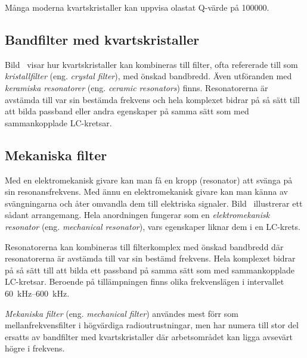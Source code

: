 Många moderna kvartskristaller kan uppvisa olastat Q-värde på 100000.

\vspace{12pt} %

\subsection{Bandfilter med kvartskristaller}
\label{bandfilter_kristall}


Bild~ visar hur kvartskristaller kan kombineras till
filter, ofta refererade till som \emph{kristallfilter} (eng.
\emph{crystal filter}), med önskad bandbredd.
Även utföranden med \emph{keramiska resonatorer} (eng.
\emph{ceramic resonators}) finns.
Resonatorerna är avstämda till var sin bestämda frekvens och hela komplexet
bidrar på så sätt till att bilda passband eller andra egenskaper på samma sätt
som med sammankopplade LC-kretsar.

\subsection{Mekaniska filter}

Med en elektromekanisk givare kan man få en kropp (resonator) att svänga på sin
resonansfrekvens.
Med ännu en elektromekanisk givare kan man känna av svängningarna och
åter omvandla dem till elektriska signaler.
Bild~ illustrerar ett sådant arrangemang.
Hela anordningen fungerar som en \emph{elektromekanisk resonator} (eng.
\emph{mechanical resonator}), vars egenskaper liknar dem i en LC-krets.

% 

Resonatorerna kan kombineras till filterkomplex med önskad bandbredd där
resonatorerna är avstämda till var sin bestämd frekvens.
Hela komplexet bidrar på så sätt till att bilda ett passband på samma sätt som
med sammankopplade LC-kretsar.
Beroende på tillämpningen finns olika frekvenslägen i intervallet
\SIrange{60}{600}{\kilo\hertz}.

\emph{Mekaniska filter} (eng. \emph{mechanical filter}) användes mest förr som
mellanfrekvensfilter i högvärdiga radioutrustningar, men har numera till stor
del ersatts av bandfilter med kvartskristaller där arbetsområdet kan ligga
avsevärt högre i frekvens.

